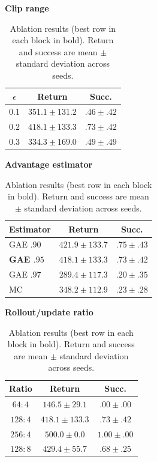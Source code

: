\documentclass{article}
\begin{document}
\begin{table}[H]
  \caption{Ablation results (best row in each block in bold). Return and success are mean $\pm$ standard deviation across seeds.}
  \label{tab:ablation}
  \centering
  \small
  \setlength{\tabcolsep}{1.5pt}
  \renewcommand{\arraystretch}{1.0}
  \begin{minipage}[t]{0.26\textwidth}
    \centering
    \textbf{Clip range}\\[-0.2em]
    \begin{tabular}{@{}ccc@{}}
      \toprule
      $\epsilon$ & Return & Succ. \\
      \midrule
      $0.1$ & $351.1{\pm}131.2$ & $.46{\pm}.42$ \\
      \textbf{$0.2$} & \textbf{$418.1{\pm}133.3$} & \textbf{$.73{\pm}.42$} \\
      $0.3$ & $334.3{\pm}169.0$ & $.49{\pm}.49$ \\
      \bottomrule
    \end{tabular}
  \end{minipage}\hfill
  \begin{minipage}[t]{0.37\textwidth}
    \centering
    \textbf{Advantage estimator}\\[-0.2em]
    \begin{tabular}{@{}lcc@{}}
      \toprule
      Estimator & Return & Succ. \\
      \midrule
      GAE $.90$ & $421.9{\pm}133.7$ & $.75{\pm}.43$ \\
      \textbf{GAE $.95$} & \textbf{$418.1{\pm}133.3$} & \textbf{$.73{\pm}.42$} \\
      GAE $.97$ & $289.4{\pm}117.3$ & $.20{\pm}.35$ \\
      MC & $348.2{\pm}112.9$ & $.23{\pm}.28$ \\
      \bottomrule
    \end{tabular}
  \end{minipage}\hfill
  \begin{minipage}[t]{0.34\textwidth}
    \centering
    \textbf{Rollout/update ratio}\\[-0.2em]
    \begin{tabular}{@{}ccc@{}}
      \toprule
      Ratio & Return & Succ. \\
      \midrule
      $64{:}4$ & $146.5{\pm}29.1$ & $.00{\pm}.00$ \\
      $128{:}4$ & $418.1{\pm}133.3$ & $.73{\pm}.42$ \\
      \textbf{$256{:}4$} & \textbf{$500.0{\pm}0.0$} & \textbf{$1.00{\pm}.00$} \\
      $128{:}8$ & $429.4{\pm}55.7$ & $.68{\pm}.25$ \\
      \bottomrule
    \end{tabular}
  \end{minipage}
\end{table}
\end{document}
